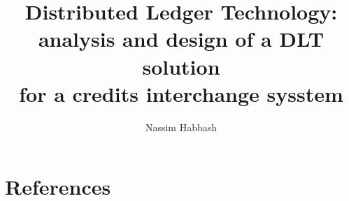 \documentclass[a4paper,12pt]{book}
\author{Nassim Habbash}
\title{Distributed Ledger Technology: \\
analysis and design of a DLT solution \\
for a credits interchange sysstem}
\begin{document}
    \frontmatter
    
    
    
    
    \tableofcontents
    \mainmatter
    

    \backmatter

    \section{References} 
    \label{sec:references}
    \printbibliography
\end{document}
